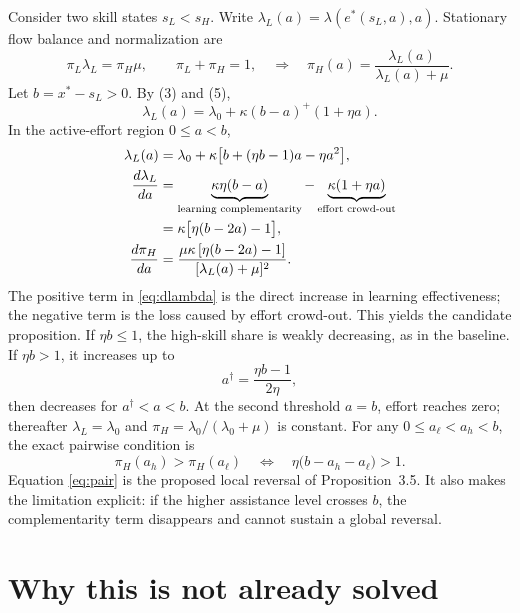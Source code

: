 \documentclass[11pt]{article}
\begin{document}
Consider two skill states $s_L<s_H$. Write
$\lambda_L(a)=\lambda(e^*(s_L,a),a)$. Stationary flow balance and normalization
are
\begin{equation}
 \pi_L\lambda_L=\pi_H\mu,\qquad \pi_L+\pi_H=1,
 \quad\Longrightarrow\quad
 \pi_H(a)=\frac{\lambda_L(a)}{\lambda_L(a)+\mu}.     \label{eq:stationary}
\end{equation}
Let $b=x^*-s_L>0$. By (3) and (5),
\begin{equation}
 \lambda_L(a)=\lambda_0+\kappa(b-a)^+(1+\eta a).    \label{eq:equilibrium-rate}
\end{equation}
In the active-effort region $0\leq a<b$,
\begin{align}
 \lambda_L(a)
   &=\lambda_0+\kappa\bigl[b+(\eta b-1)a-\eta a^2\bigr],\notag\\
 \frac{d\lambda_L}{da}
   &=\underbrace{\kappa\eta(b-a)}_{\text{learning complementarity}}
     -\underbrace{\kappa(1+\eta a)}_{\text{effort crowd-out}}\notag\\
   &=\kappa\bigl[\eta(b-2a)-1\bigr],\label{eq:dlambda}\\
 \frac{d\pi_H}{da}
   &=\frac{\mu\kappa\,[\eta(b-2a)-1]}
           {[\lambda_L(a)+\mu]^2}.                 \label{eq:dpi}
\end{align}
The positive term in \eqref{eq:dlambda} is the direct increase in learning effectiveness;
the negative term is the loss caused by effort crowd-out. This yields the
candidate proposition. If $\eta b\leq1$, the high-skill share is weakly
decreasing, as in the baseline. If $\eta b>1$, it increases up to
\begin{equation}
 a^\dagger=\frac{\eta b-1}{2\eta},                  \label{eq:threshold}
\end{equation}
then decreases for $a^\dagger<a<b$. At the second threshold $a=b$, effort
reaches zero; thereafter $\lambda_L=\lambda_0$ and
$\pi_H=\lambda_0/(\lambda_0+\mu)$ is constant. For any
$0\leq a_\ell<a_h<b$, the exact pairwise condition is
\begin{equation}
 \pi_H(a_h)>\pi_H(a_\ell)
 \quad\Longleftrightarrow\quad
 \eta\bigl(b-a_h-a_\ell\bigr)>1.                  \label{eq:pair}
\end{equation}
Equation \eqref{eq:pair} is the proposed local reversal of Proposition~3.5. It also makes
the limitation explicit: if the higher assistance level crosses $b$, the
complementarity term disappears and cannot sustain a global reversal.

\section{Why this is not already solved}
\end{document}
